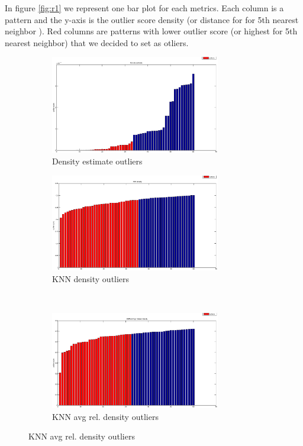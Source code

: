 In figure  \ref{fig:r1} we represent one bar plot for each metrics. Each column is a pattern and the y-axis is the outlier score density (or distance for for 5th nearest neighbor ).  Red columns are patterns with lower outlier score (or highest for 5th nearest neighbor) that we decided to set as otliers.

\begin{figure}[htbp]
        \center
       	\begin{subfigure}[b]{0.46\textwidth}
                \includegraphics[width=7.4cm]{figures/01.eps}
                \caption{Density estimate outliers}
        \end{subfigure}%
        \qquad
        \begin{subfigure}[b]{0.46\textwidth}
                \includegraphics[width=7.4cm]{figures/02.eps}
                \caption{KNN density outliers}
         \end{subfigure} \\
	 \begin{subfigure}[b]{0.46\textwidth}
                 \linespread{1}
                \includegraphics[width=7.4cm]{figures/03.eps}
                \caption{KNN avg rel. density outliers }
        \end{subfigure}

\end{figure}
